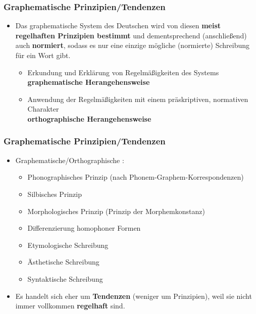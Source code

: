 \begin{frame}
\frametitle{Graphematische Prinzipien/Tendenzen}

\begin{itemize}
	\item Das graphematische System des Deutschen wird von diesen
	\textbf{meist regelhaften Prinzipien bestimmt} und dementsprechend
	(anschließend) auch \textbf{normiert}, sodass es nur eine einzige
	mögliche (normierte) Schreibung für ein Wort gibt.
	
	\begin{itemize}
		\item Erkundung und Erklärung von Regelmäßigkeiten des Systems \\
		\ras \textbf{graphematische Herangehensweise}
		
		\item Anwendung der Regelmäßigkeiten mit einem präskriptiven,
		normativen Charakter \\
		\ras \textbf{orthographische Herangehensweise}
	\end{itemize}
\end{itemize}

\end{frame}


\begin{frame}
\frametitle{Graphematische Prinzipien/Tendenzen}

\begin{itemize}
	\item Graphematische/Orthographische :
	
	\begin{itemize}
		\item Phonographisches Prinzip (nach Phonem-Graphem-Korrespondenzen)

		\item Silbisches Prinzip

		\item Morphologisches Prinzip (Prinzip der Morphemkonstanz)

		\item Differenzierung homophoner Formen

		\item Etymologische Schreibung

		\item Ästhetische Schreibung 

		\item Syntaktische Schreibung 
	\end{itemize}

\item  Es handelt sich eher um \textbf{Tendenzen} (weniger um Prinzipien), weil sie nicht immer vollkommen \textbf{regelhaft} sind.

\end{itemize}


\end{frame}


